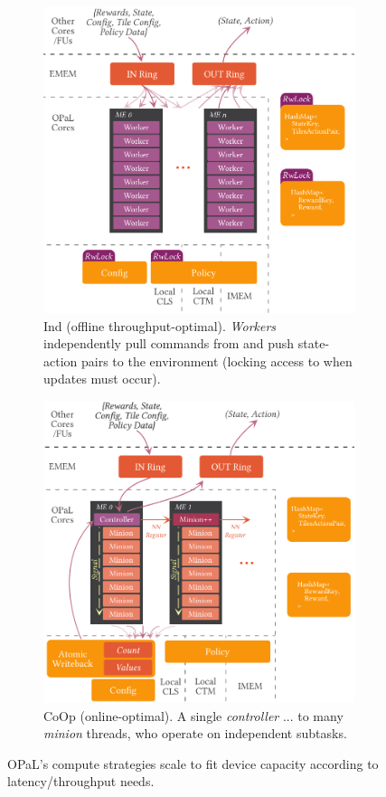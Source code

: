 \documentclass[sigconf,natbib=false]{acmart}
\newcommand{\approachshort}{OPaL}
\newcommand{\Coopfw}{CoOp}
\newcommand{\Indfw}{Ind}
\begin{document}
\begin{figure}
	\centering
	\begin{subfigure}{0.45\linewidth}
		\centering
		\includegraphics[keepaspectratio, width=0.9\linewidth]{figures/ind}
		\caption{\Indfw{} (offline throughput-optimal). \emph{Workers} independently pull commands from and push state-action pairs to the environment (locking access to when updates must occur).\label{fig:single-and-parallel:single}}
	\end{subfigure}
\hspace{0.04\linewidth}
	\begin{subfigure}{0.45\linewidth}
		\centering
		\includegraphics[keepaspectratio, width=0.9\linewidth]{figures/coop}
		\caption{\Coopfw{} (online-optimal). A single \emph{controller} ... to many \emph{minion} threads, who operate on independent subtasks.\label{fig:single-and-parallel:parallel}}
	\end{subfigure}
	\caption{\approachshort{}'s compute strategies scale to fit device capacity according to latency/throughput needs.\label{fig:single-and-parallel}}
\end{figure}
\end{document}
